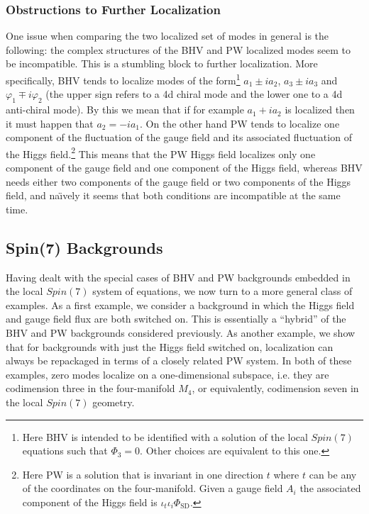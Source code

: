 \documentclass[12pt]{article}%
\numberwithin{equation}{section}
\renewcommand{\(}{\left(}
\renewcommand{\)}{\right)}
\renewcommand{\[}{\left[}
\renewcommand{\]}{\right]}
\begin{document}
\subsubsection{Obstructions to Further Localization}

One issue when comparing the two localized set of modes in general is the following: the complex structures of the BHV and PW localized modes seem to be incompatible. This is a stumbling block to further localization. More specifically, BHV tends to localize modes of the form\footnote{Here BHV is intended to be identified with a solution of the local $Spin(7)$ equations
such that $\Phi_3 = 0$. Other choices are equivalent to this one.} $a_1 \pm i a_2$, $a_3 \pm i a_3 $ and $\varphi_1 \mp i \varphi_2$ (the upper sign refers to a 4d chiral mode and the lower one to a 4d anti-chiral mode). By this we mean that if for example $a_1 + i a_2$ is localized then it must happen that $a_2 = - i a_1$. On the other hand PW tends to localize one component of the fluctuation of the gauge field and its associated fluctuation of the Higgs field.\footnote{Here PW is a solution that is invariant in one direction $t$ where $t$ can be any of the coordinates on the four-manifold. Given a gauge field $A_i$ the associated component of the Higgs field is $\iota_t \iota_ i \Phi_{\text{SD}}$.} This means that the PW Higgs field localizes only one component of the gauge field and one component of the Higgs field, whereas BHV needs either two components of the gauge field or two components of the Higgs field, and na{\"\i}vely it seems that both conditions are incompatible at the same time.

\subsection{Spin(7) Backgrounds}

Having dealt with the special cases of BHV and PW backgrounds embedded in the local $Spin(7)$ system of equations, we now turn to a more general class of examples. As a first example, we consider a background in which the Higgs field and gauge field flux are both switched on. This is essentially a ``hybrid'' of the BHV and PW backgrounds considered previously. As another example, we show that for backgrounds with just the
Higgs field switched on, localization can always be repackaged in terms of a closely related PW system. In both of these examples, zero modes localize on a one-dimensional subspace, i.e. they are codimension three in the four-manifold $M_4$, or equivalently, codimension seven in the local $Spin(7)$ geometry.
\end{document}
